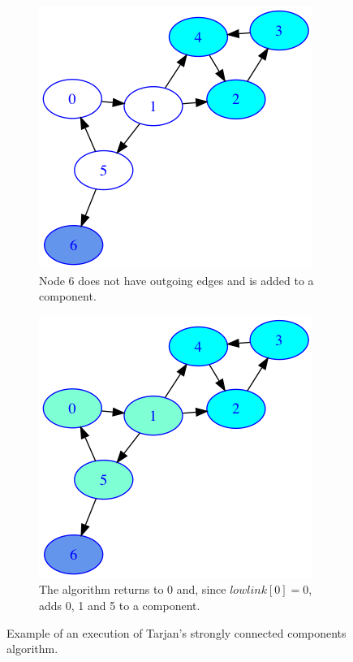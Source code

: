 \begin{figure}
\begin{subfigure}{0.3\textwidth}
\includegraphics[width=\linewidth]{images/tarjan/6.png}
\caption{Node $6$ does not have outgoing edges and is added to a component.} \label{fig:tarjan6}
\end{subfigure}
\hspace*{2cm} %
\begin{subfigure}{0.3\textwidth}
\includegraphics[width=\linewidth]{images/tarjan/7.png}
\caption{The algorithm returns to 0 and, since $lowlink[0] = 0$, adds 0, 1 and 5 to a component.} \label{fig:tarjan7}
\end{subfigure}


\caption{Example of an execution of Tarjan's strongly connected components algorithm.}\label{fig:tarjan}
\end{figure}

